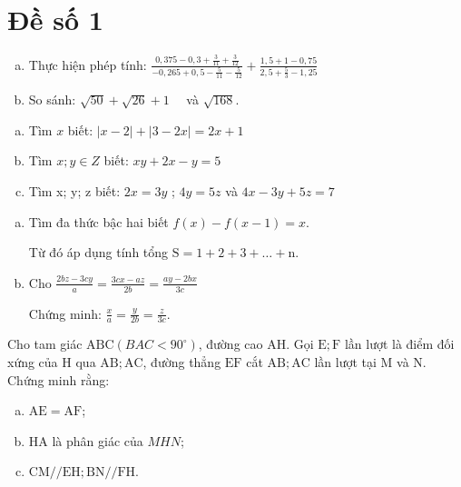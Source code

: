 \onehalfspacing
\section{Đề số 1}

\begin{bt}
    \hfill
    \begin{enumerate}[a.]
        \item Thực hiện phép tính: $\frac{0,375-0,3+\frac{3}{11}+\frac{3}{12}}{-0,265+0,5-\frac{5}{11}-\frac{5}{12}}+\frac{1,5+1-0,75}{2,5+\frac{5}{3}-1,25}$
        \item So sánh: $\sqrt{50}+\sqrt{26}+1 \quad$ và $\sqrt{168}$.
    \end{enumerate}
\loigiai{} 
\end{bt}

\begin{bt}
    \hfill
    \begin{enumerate}[a.]
        \item Tìm $x$ biết: $|x-2|+|3-2 x|=2 x+1$
        \item Tìm $x ; y \in Z$ biết: $x y+2 x-y=5$
        \item Tìm x; y; z biết: $2 x=3 y$ ; $4 y=5 z$ và $4 x-3 y+5 z=7$
    \end{enumerate}
\loigiai{} 
\end{bt}

\begin{bt}
    \hfill
    \begin{enumerate}[a.]
        \item Tìm đa thức bậc hai biết $f(x)-f(x-1)=x$.
        
        Từ đó áp dụng tính tổng $\mathrm{S}=1+2+3+\ldots+\mathrm{n}$.
        \item Cho $\frac{2 b z-3 c y}{a}=\frac{3 c x-a z}{2 b}=\frac{a y-2 b x}{3 c}$
        
        Chứng minh: $\frac{x}{a}=\frac{y}{2 b}=\frac{z}{3 c}$.
    \end{enumerate}
\loigiai{} 
\end{bt}

\begin{bt}
    \hfill
    Cho tam giác $\mathrm{ABC}\left(B A C<90^{\circ}\right)$, đường cao $\mathrm{AH}$. Gọi $\mathrm{E} ; \mathrm{F}$ lần lượt là điểm đối xứng của $\mathrm{H}$ qua $\mathrm{AB} ; \mathrm{AC}$, đường thẳng $\mathrm{EF}$ cắt $\mathrm{AB} ; \mathrm{AC}$ lần lượt tại $\mathrm{M}$ và $\mathrm{N}$. Chứng minh rằng:
    \begin{enumerate}[a.]
    \item $\mathrm{AE}=\mathrm{AF}$;
    \item HA là phân giác của $M H N$;
    \item $\mathrm{CM} / / \mathrm{EH} ; \mathrm{BN} / / \mathrm{FH}$.
    \end{enumerate}
\loigiai{}
\end{bt}